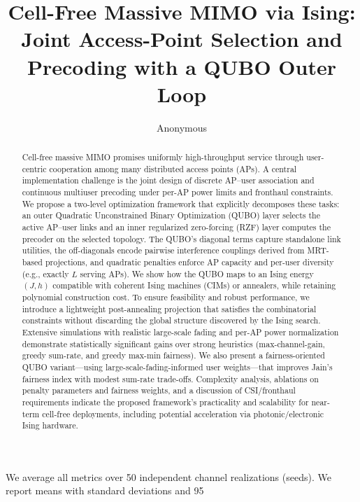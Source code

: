 {\usepackage{algorithm}
\usepackage{algpseudocode}
\usepackage{booktabs}
\usepackage{siunitx}
\usepackage{cite}
\usepackage{hyperref}
\hypersetup{colorlinks=true, linkcolor=black, citecolor=black, urlcolor=black}

\newcommand{\E}{\mathbb{E}}
\newcommand{\R}{\mathbb{R}}
\newcommand{\1}{\mathbf{1}}



\title{Cell-Free Massive MIMO via Ising: Joint Access-Point Selection and Precoding with a QUBO Outer Loop}

\author{Anonymous}
\maketitle

\begin{abstract}
Cell-free massive MIMO promises uniformly high-throughput service through user-centric cooperation among many distributed access points (APs). A central implementation challenge is the joint design of discrete AP–user association and continuous multiuser precoding under per-AP power limits and fronthaul constraints. We propose a two-level optimization framework that explicitly decomposes these tasks: an outer Quadratic Unconstrained Binary Optimization (QUBO) layer selects the active AP–user links and an inner regularized zero-forcing (RZF) layer computes the precoder on the selected topology. The QUBO’s diagonal terms capture standalone link utilities, the off-diagonals encode pairwise interference couplings derived from MRT-based projections, and quadratic penalties enforce AP capacity and per-user diversity (e.g., exactly $L$ serving APs). We show how the QUBO maps to an Ising energy $(J,h)$ compatible with coherent Ising machines (CIMs) or annealers, while retaining polynomial construction cost. To ensure feasibility and robust performance, we introduce a lightweight post-annealing projection that satisfies the combinatorial constraints without discarding the global structure discovered by the Ising search. Extensive simulations with realistic large-scale fading and per-AP power normalization demonstrate statistically significant gains over strong heuristics (max-channel-gain, greedy sum-rate, and greedy max-min fairness). We also present a fairness-oriented QUBO variant—using large-scale-fading-informed user weights—that improves Jain’s fairness index with modest sum-rate trade-offs. Complexity analysis, ablations on penalty parameters and fairness weights, and a discussion of CSI/fronthaul requirements indicate the proposed framework’s practicality and scalability for near-term cell-free deployments, including potential acceleration via photonic/electronic Ising hardware.
\end{abstract}
We average all metrics over 50 independent channel realizations (seeds). We report means with standard deviations and 95%

}
